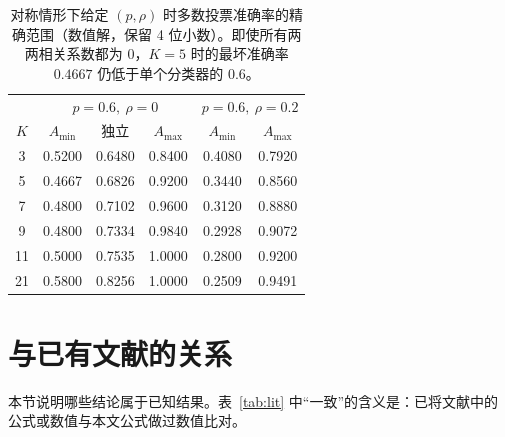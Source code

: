 \documentclass[11pt]{article}
\begin{document}
\begin{table}[H]
\centering
\small
\begin{tabular}{c|ccc|cc}
\toprule
 & \multicolumn{3}{c|}{$p=0.6,\ \rho=0$} & \multicolumn{2}{c}{$p=0.6,\ \rho=0.2$}\\
$K$ & $A_{\min}$ & 独立 & $A_{\max}$ & $A_{\min}$ & $A_{\max}$\\
\midrule
3 & 0.5200 & 0.6480 & 0.8400 & 0.4080 & 0.7920\\
5 & 0.4667 & 0.6826 & 0.9200 & 0.3440 & 0.8560\\
7 & 0.4800 & 0.7102 & 0.9600 & 0.3120 & 0.8880\\
9 & 0.4800 & 0.7334 & 0.9840 & 0.2928 & 0.9072\\
11 & 0.5000 & 0.7535 & 1.0000 & 0.2800 & 0.9200\\
21 & 0.5800 & 0.8256 & 1.0000 & 0.2509 & 0.9491\\
\bottomrule
\end{tabular}
\caption{对称情形下给定 $(p,\rho)$ 时多数投票准确率的精确范围（数值解，保留 4 位小数）。即使所有两两相关系数都为 0，$K=5$ 时的最坏准确率 $0.4667$ 仍低于单个分类器的 $0.6$。}
\label{tab:generalK}
\end{table}

\section{与已有文献的关系}\label{sec:lit}

本节说明哪些结论属于已知结果。表~\ref{tab:lit} 中“一致”的含义是：已将文献中的公式或数值与本文公式做过数值比对。
\end{document}
